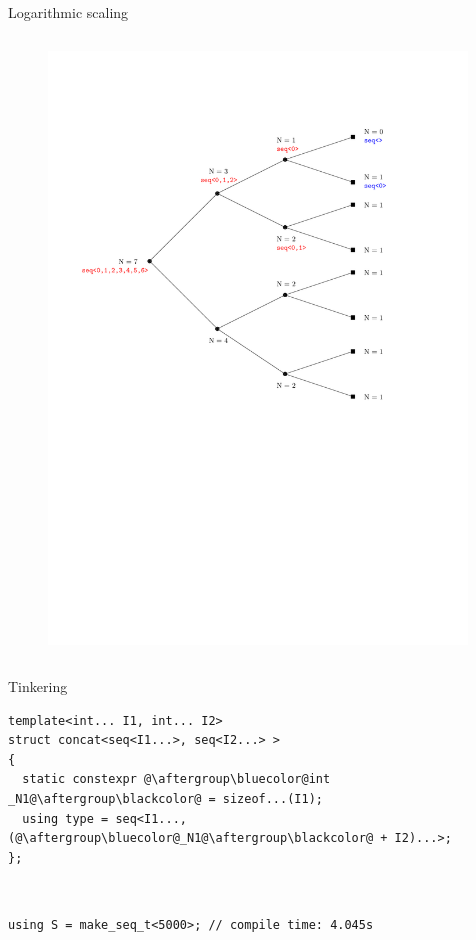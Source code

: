 \documentclass[xcolor=dvipsnames]{beamer}
\begin{document}
\begin{frame}[fragile]{Logarithmic scaling}
  \begin{columns}[T] %
    \begin{column}{0.7\textwidth}
      \begin{figure}[H]
        \centering
        \includegraphics[width=0.99\textwidth]{logarithmic_seq}
      \end{figure}
    \end{column}%
  \end{columns}
\end{frame}


\begin{frame}[fragile]{Tinkering}
\begin{lstlisting}
template<int... I1, int... I2>
struct concat<seq<I1...>, seq<I2...> >
{
  static constexpr @\aftergroup\bluecolor@int _N1@\aftergroup\blackcolor@ = sizeof...(I1);
  using type = seq<I1..., (@\aftergroup\bluecolor@_N1@\aftergroup\blackcolor@ + I2)...>;
};
\end{lstlisting}

~

\begin{lstlisting}
using S = make_seq_t<5000>; // compile time: 4.045s
\end{lstlisting}
\end{frame}
\end{document}
